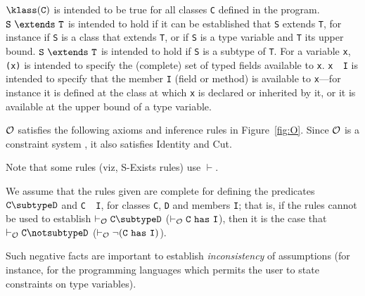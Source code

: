 $\klass({\tt C})$ is intended to be true for all classes {\tt C}
defined in the program. ${\tt S}\ \extends\ {\tt T}$ is intended to
hold if it can be established that {\tt S} extends {\tt T}, for
instance if {\tt S} is a class that extends {\tt T}, or if {\tt S} is
a type variable and {\tt T} its upper bound. ${\tt S}\ \extends\ {\tt
T}$ is intended to hold if {\tt S} is a subtype of {\tt T}.  For a
variable {\tt x}, {\tt \fields({\tt x})} is intended to specify the
(complete) set of typed fields available to {\tt x}.  {\tt x\ \has\ I}
is intended to specify that the member {\tt I} (field or method) is
available to {\tt x}---for instance it is defined at the class at
which {\tt x} is declared or inherited by it, or it is available at
the upper bound of a type variable.


$\cal O$ satisfies the following axioms and inference rules in
Figure~\ref{fig:O}. Since $\cal O$ is a constraint system \cite{cccc},
it also satisfies Identity and Cut.

Note that some rules (viz, {\sc S-Exists} rules)
use $\vdash$. 

We assume that the rules given are complete for
defining the predicates $\tt C \subtype D$ and {\tt C\ \has\ I}, for
classes {\tt C}, {\tt D} and members {\tt I}; that is, if the rules
cannot be used to establish $\tt \vdash_{\cal O} C \subtype D$ ($\tt
\vdash_{\cal O} C\ \has\ I$), then it is the case that $\tt
\vdash_{\cal O} C \notsubtype D$ ($\tt \vdash_{\cal O} \neg (C\ \has\
I)$).

Such negative facts are important to establish {\em inconsistency} of
assumptions (for instance, for the programming languages which permits
the user to state constraints on type variables).  

